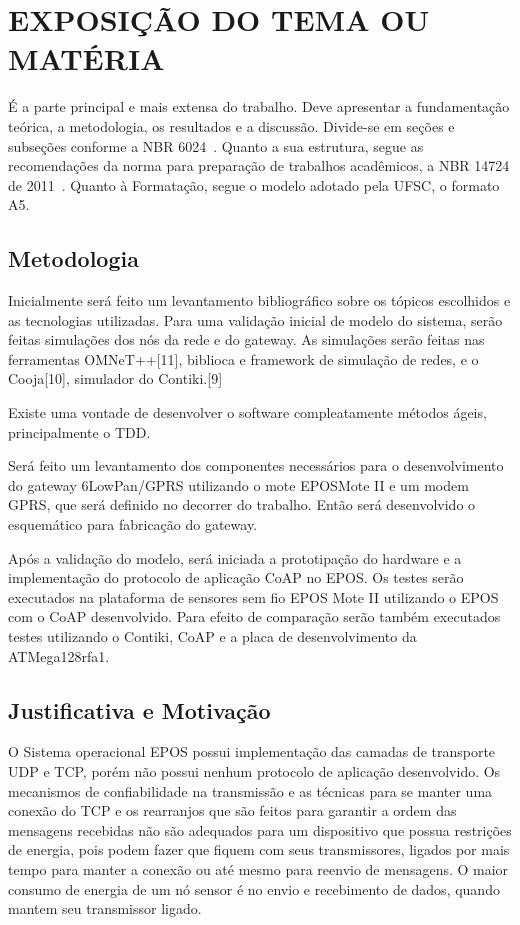 \section{EXPOSIÇÃO DO TEMA OU MATÉRIA}

É a parte principal e mais extensa do trabalho. Deve apresentar a fundamentação teórica, a metodologia, os resultados e a discussão. Divide-se em seções e subseções conforme a NBR 6024~\cite{abnt14724}. Quanto a sua estrutura, segue as recomendações da norma para preparação de trabalhos acadêmicos, a NBR 14724 de 2011~\cite{abnt14724}. Quanto à Formatação, segue o modelo adotado pela UFSC, o formato A5.

\subsection{Metodologia}

Inicialmente será feito um levantamento bibliográfico sobre os tópicos escolhidos e as tecnologias utilizadas. Para uma validação inicial de modelo do sistema, serão feitas simulações dos nós da rede e do gateway. As simulações serão feitas nas ferramentas OMNeT++[11], biblioca e framework de simulação de redes, e o Cooja[10], simulador do Contiki.[9]

Existe uma vontade de desenvolver o software compleatamente métodos ágeis, principalmente o TDD.

Será feito um levantamento dos componentes necessários para o desenvolvimento do gateway 6LowPan/GPRS utilizando o mote EPOSMote II e um modem GPRS, que será definido no decorrer do trabalho. Então será desenvolvido o esquemático para fabricação do gateway.

Após a validação do modelo, será iniciada a prototipação do hardware e a implementação do protocolo de aplicação CoAP no EPOS. Os testes serão executados na plataforma de sensores sem fio EPOS Mote II utilizando o EPOS com o CoAP desenvolvido. Para efeito de comparação serão também executados testes utilizando o Contiki, CoAP e a placa de desenvolvimento da ATMega128rfa1.

\subsection{Justificativa e Motivação}

O Sistema operacional EPOS possui implementação das camadas de transporte UDP e TCP, porém não possui nenhum protocolo de aplicação desenvolvido.
Os mecanismos de confiabilidade na transmissão e as técnicas para se manter uma conexão do TCP e os rearranjos que são feitos para garantir a ordem das mensagens recebidas não são adequados para um dispositivo que possua restrições de energia, pois podem fazer que fiquem com seus transmissores, ligados por mais tempo para manter a conexão ou até mesmo para reenvio de mensagens. O maior consumo de energia de um nó sensor é no envio e recebimento de dados, quando mantem seu transmissor ligado.

